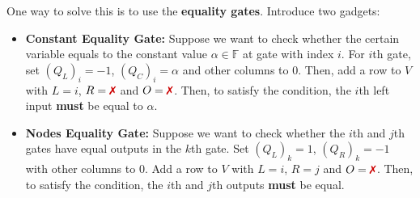 \documentclass[../lecture-notes-148x210.tex]{subfiles}
\begin{document}
\begin{proposition}

One way to solve this is to use the \textbf{equality gates}. Introduce two gadgets:
\begin{itemize}
    \item \textbf{Constant Equality Gate:} Suppose we want to check whether the
    certain variable equals to the constant value $\alpha \in \mathbb{F}$ at
    gate with index $i$. For $i$th gate, set $(Q_L)_i = -1$, $(Q_C)_i = \alpha$
    and other columns to $0$. Then, add a row to $V$ with $L = i$, $R =
    \text{\xmark}$ and $O = \text{\xmark}$. Then, to satisfy the condition, the
    $i$th left input \textbf{must} be equal to $\alpha$.
    \item \textbf{Nodes Equality Gate:} Suppose we want to check whether the
    $i$th and $j$th gates have equal outputs in the $k$th gate. Set $(Q_L)_k = 1$, $(Q_R)_k = -1$ 
    with other columns to $0$. Add a row to $V$ with $L =
    i$, $R = j$ and $O = \text{\xmark}$. Then, to satisfy the condition, the
    $i$th and $j$th outputs \textbf{must} be equal.
\end{itemize}

\end{proposition}
\end{document}
